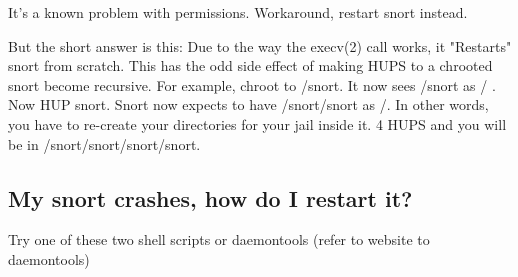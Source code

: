 \documentclass{article}
\begin{document}
It's a known problem with permissions. Workaround, restart snort instead.

But the short answer is this:  Due to the way the execv(2) call works, it
"Restarts" snort from scratch.  This has the odd side effect of making 
HUPS to a chrooted snort become recursive.  For example, chroot to /snort.
It now sees /snort as / .  Now HUP snort.  Snort now expects to have 
/snort/snort as /.  In other words, you have to re-create your directories 
for your jail inside it.  4 HUPS and you will be in 
/snort/snort/snort/snort.  

\subsection{My snort crashes, how do I restart it?}

Try one of these two shell scripts or daemontools (refer to website to
daemontools)
\end{document}
